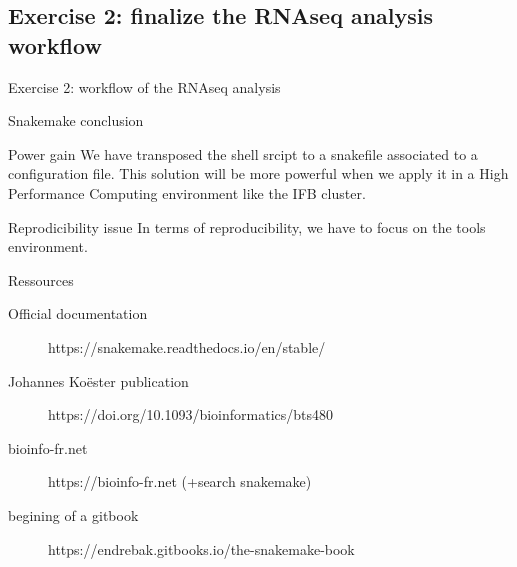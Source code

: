 \subsection[SnakemakeEx2]{Exercise 2: finalize the RNAseq analysis workflow}
\begin{frame}{}
    \huge{Exercise 2: workflow of the RNAseq analysis}
\end{frame}

\begin{frame}{Snakemake conclusion}
\begin{block}{Power gain}
We have transposed the shell srcipt to a snakefile associated to a configuration file. This solution will be more powerful when we apply it in a High Performance Computing environment like the IFB cluster.
\end{block}
\begin{block}{Reprodicibility issue}
In terms of reproducibility, we have to focus on the tools environment.
\end{block}
\end{frame}
\begin{frame}{Ressources}
\begin{description}
    \item [Official documentation] https://snakemake.readthedocs.io/en/stable/
    \item [Johannes Koëster publication] https://doi.org/10.1093/bioinformatics/bts480
    \item [bioinfo-fr.net]  https://bioinfo-fr.net (+search snakemake)
    \item [begining of a gitbook] https://endrebak.gitbooks.io/the-snakemake-book
\end{description}
    
\end{frame}
